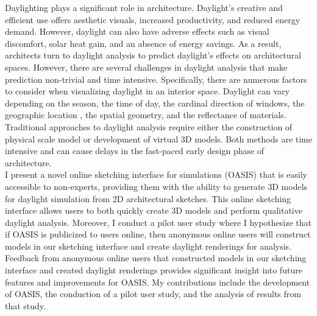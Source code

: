 Daylighting plays a significant role in architecture.
Daylight's creative and efficient use offers aesthetic visuals, increased productivity, and reduced energy demand. 
However, daylight can also have adverse effects such as visual discomfort, solar heat gain, and an absence of energy savings. 
%
As a result, architects turn to daylight analysis to predict daylight's effects on architectural spaces. However, there are several challenges in daylight analysis that make prediction non-trivial and time intensive. Specifically, there are numerous factors to consider when visualizing daylight in an interior space. Daylight can vary depending on the season, the time of day, the cardinal direction of windows, the geographic location , the spatial geometry, and the reflectance of materials. 
%
Traditional approaches to daylight analysis require either the construction of physical scale model or development of virtual 3D models. Both methods are time intensive and can cause delays in the fast-paced early design phase of architecture. \\

I present a novel online sketching interface for simulations (OASIS) that is easily accessible to non-experts, providing them with the ability to generate 3D models for daylight simulation from 2D architectural sketches. 
This online sketching interface allows users to both quickly create 3D models and perform qualitative daylight analysis.
%
Moreover, I conduct a pilot user study where I hypothesize that if OASIS is publicized to users online, then anonymous online users will construct models in our sketching interface and create daylight renderings for analysis. Feedback from anonymous online users that constructed models in our sketching interface and created daylight renderings provides significant insight into future features and improvements for OASIS.
%
My contributions include the development of OASIS, the conduction of a pilot user study, and the analysis of results from that study. \\

